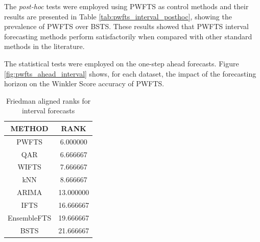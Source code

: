 The \textit{post-hoc} tests were employed using PWFTS as control methods and their results are presented in Table \ref{tab:pwfts_interval_posthoc}, showing the prevalence of PWFTS over BSTS. These results showed that PWFTS interval forecasting methods perform satisfactorily when compared with other standard methods in the literature. 

The statistical tests were employed on the one-step ahead forecasts. Figure \ref{fig:pwfts_ahead_interval} shows, for each dataset, the impact of the forecasting horizon on the Winkler Score accuracy of PWFTS.


\begin{table}[h]
    \caption{Average Winkler Score with $\alpha=.05$ for one step ahead interval forecasts}
    \label{tab:pwfts_interval_results}
\end{table}

\begin{table}[hbt]
    \centering
    \begin{tabular}{|c|c|}
\hline
       METHOD &       RANK \\
\hline
PWFTS &   6.000000 \\
QAR &   6.666667 \\
WIFTS &   7.666667 \\
kNN &   8.666667 \\
ARIMA &  13.000000 \\
IFTS &  16.666667 \\
EnsembleFTS &  19.666667 \\
BSTS &  21.666667 \\
\hline
\end{tabular}
    \caption{Friedman aligned ranks for interval forecasts }
    \label{tab:pwfts_interval_ranks}
\end{table}


